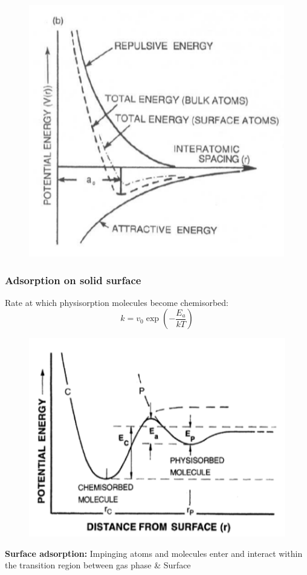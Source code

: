 \begin{figure}[h]
    \centering
    \includegraphics[width=\columnwidth]{images/atombond.png}
    \label{fig:atombond}
\end{figure}
\subsubsection{Adsorption on solid surface}
Rate at which physisorption molecules become chemisorbed:
\[
k = v_0 \exp\left(-\frac{E_a}{kT}\right)
\]
\begin{figure}[h]
    \centering
    \includegraphics[width=0.7\columnwidth]{images/surfacedistance.png}
    \label{fig:surfdist}
\end{figure}
\textbf{Surface adsorption: }Impinging atoms and molecules enter and interact within the transition region between gas phase \& Surface

